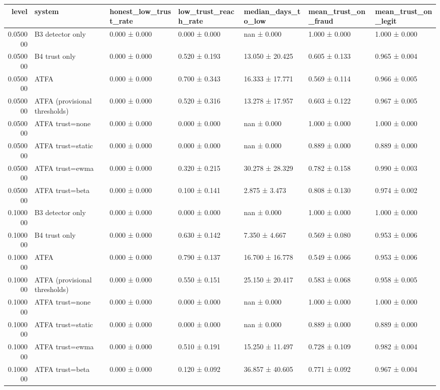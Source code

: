 \begin{tabular}{rllllll}
\toprule
level & system & honest\_low\_trust\_rate & low\_trust\_reach\_rate & median\_days\_to\_low & mean\_trust\_on\_fraud & mean\_trust\_on\_legit \\
\midrule
0.050000 & B3 detector only & 0.000 ± 0.000 & 0.000 ± 0.000 & nan ± 0.000 & 1.000 ± 0.000 & 1.000 ± 0.000 \\
0.050000 & B4 trust only & 0.000 ± 0.000 & 0.520 ± 0.193 & 13.050 ± 20.425 & 0.605 ± 0.133 & 0.965 ± 0.004 \\
0.050000 & ATFA & 0.000 ± 0.000 & 0.700 ± 0.343 & 16.333 ± 17.771 & 0.569 ± 0.114 & 0.966 ± 0.005 \\
0.050000 & ATFA (provisional thresholds) & 0.000 ± 0.000 & 0.520 ± 0.316 & 13.278 ± 17.957 & 0.603 ± 0.122 & 0.967 ± 0.005 \\
0.050000 & ATFA trust=none & 0.000 ± 0.000 & 0.000 ± 0.000 & nan ± 0.000 & 1.000 ± 0.000 & 1.000 ± 0.000 \\
0.050000 & ATFA trust=static & 0.000 ± 0.000 & 0.000 ± 0.000 & nan ± 0.000 & 0.889 ± 0.000 & 0.889 ± 0.000 \\
0.050000 & ATFA trust=ewma & 0.000 ± 0.000 & 0.320 ± 0.215 & 30.278 ± 28.329 & 0.782 ± 0.158 & 0.990 ± 0.003 \\
0.050000 & ATFA trust=beta & 0.000 ± 0.000 & 0.100 ± 0.141 & 2.875 ± 3.473 & 0.808 ± 0.130 & 0.974 ± 0.002 \\
0.100000 & B3 detector only & 0.000 ± 0.000 & 0.000 ± 0.000 & nan ± 0.000 & 1.000 ± 0.000 & 1.000 ± 0.000 \\
0.100000 & B4 trust only & 0.000 ± 0.000 & 0.630 ± 0.142 & 7.350 ± 4.667 & 0.569 ± 0.080 & 0.953 ± 0.006 \\
0.100000 & ATFA & 0.000 ± 0.000 & 0.790 ± 0.137 & 16.700 ± 16.778 & 0.549 ± 0.066 & 0.953 ± 0.006 \\
0.100000 & ATFA (provisional thresholds) & 0.000 ± 0.000 & 0.550 ± 0.151 & 25.150 ± 20.417 & 0.583 ± 0.068 & 0.958 ± 0.005 \\
0.100000 & ATFA trust=none & 0.000 ± 0.000 & 0.000 ± 0.000 & nan ± 0.000 & 1.000 ± 0.000 & 1.000 ± 0.000 \\
0.100000 & ATFA trust=static & 0.000 ± 0.000 & 0.000 ± 0.000 & nan ± 0.000 & 0.889 ± 0.000 & 0.889 ± 0.000 \\
0.100000 & ATFA trust=ewma & 0.000 ± 0.000 & 0.510 ± 0.191 & 15.250 ± 11.497 & 0.728 ± 0.109 & 0.982 ± 0.004 \\
0.100000 & ATFA trust=beta & 0.000 ± 0.000 & 0.120 ± 0.092 & 36.857 ± 40.605 & 0.771 ± 0.092 & 0.967 ± 0.004 \\

\end{tabular}
